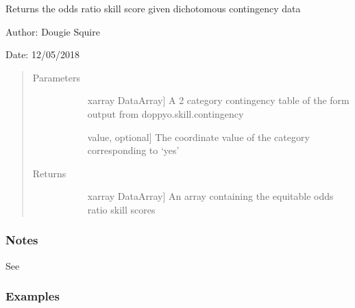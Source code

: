 \documentclass[letterpaper,10pt,english]{sphinxmanual}
\begin{document}

\begin{fulllineitems}
\label{\detokenize{skill_doc:skill.odds_ratio_skill_score}}
Returns the odds ratio skill score given dichotomous contingency data

\begin{DUlineblock}{0em}
\item[] Author: Dougie Squire
\item[] Date: 12/05/2018
\end{DUlineblock}
\begin{quote}\begin{description}
\item[{Parameters}] \leavevmode\begin{description}
\item[{}] \leavevmode{[}xarray DataArray{]}
A 2 category contingency table of the form output from doppyo.skill.contingency

\item[{}] \leavevmode{[}value, optional{]}
The coordinate value of the category corresponding to ‘yes’

\end{description}

\item[{Returns}] \leavevmode\begin{description}
\item[{}] \leavevmode{[}xarray DataArray{]}
An array containing the equitable odds ratio skill scores

\end{description}

\end{description}\end{quote}
\subsubsection*{Notes}

See 
\subsubsection*{Examples}


\end{fulllineitems}
\end{document}
